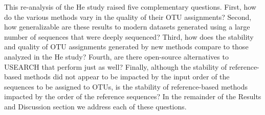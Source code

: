 \documentclass[11pt,]{article}
\begin{document}
This re-analysis of the He study raised five complementary questions.
First, how do the various methods vary in the quality of their OTU
assignments? Second, how generalizable are these results to modern
datasets generated using a large number of sequences that were deeply
sequenced? Third, how does the stability and quality of OTU assignments
generated by new methods compare to those analyzed in the He study?
Fourth, are there open-source alternatives to USEARCH that perform just
as well? Finally, although the stability of reference-based methods did
not appear to be impacted by the input order of the sequences to be
assigned to OTUs, is the stability of reference-based methods impacted
by the order of the reference sequences? In the remainder of the Results
and Discussion section we address each of these questions.
\end{document}
